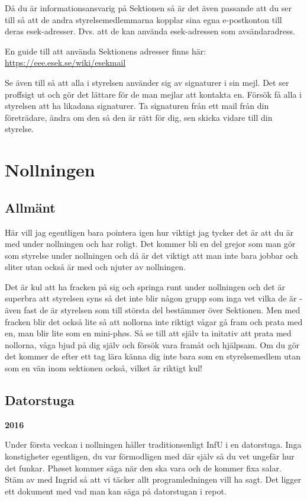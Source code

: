 \documentclass[10pt]{article}
\begin{document}
Då du är informationsansvarig på Sektionen så är det även passande att du ser till så att de andra styrelsemedlemmarna kopplar sina egna e-postkonton till deras esek-adresser. Dvs. att de kan använda esek-adressen som avsändaradress.

En guide till att använda Sektionens adresser finns här: \url{https://eee.esek.se/wiki/esekmail}

Se även till så att alla i styrelsen använder sig av signaturer i sin mejl. Det ser proffsigt ut och gör det lättare för de man mejlar att kontakta en. Försök få alla i styrelsen att ha likadana signaturer. Ta signaturen från ett mail från din företrädare, ändra om den så den är rätt för dig, sen skicka vidare till din styrelse.
\newpage
\section{Nollningen}
\subsection{Allmänt}
Här vill jag egentligen bara pointera igen hur viktigt jag tycker det är att du är med under nollningen och har roligt. Det kommer bli en del grejor som man gör som styrelse under nollningen och då är det viktigt att man inte bara jobbar och sliter utan också är med och njuter av nollningen.

Det är kul att ha fracken på sig och springa runt under nollningen och det är superbra att styrelsen syns så det inte blir någon grupp som inga vet vilka de är - även fast de är styrelsen som till största del bestämmer över Sektionen. Men med fracken blir det också lite så att nollorna inte riktigt vågar gå fram och prata med en, man blir lite som en mini-ph\o s. Så se till att själv ta initativ att prata med nollorna, våga bjud på dig själv och försök vara framåt och hjälpsam. Om du gör det kommer de efter ett tag lära känna dig inte bara som en styrelsemedlem utan som en vän inom sektionen också, vilket är riktigt kul!
\subsection{Datorstuga}
\textbf{2016}

Under första veckan i nollningen håller traditionsenligt InfU i en datorstuga. Inga konstigheter egentligen, du var förmodligen med där själv så du vet ungefär hur det funkar. Ph\o set kommer säga när den ska vara och de kommer fixa salar. Stäm av med Ingrid så att vi täcker allt programledningen vill ha sagt. Det ligger ett dokument med vad man kan säga på datorstugan i repot.
\end{document}
